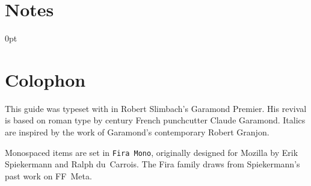 
\chapter{Notes}


\newlength{\enotewidth}
\settowidth{\enotewidth}{00.\enspace}

\renewcommand\enoteheading{}
\renewcommand\makeenmark{\theenmark.\enspace}
\renewcommand\enotesize{\normalsize}
\renewcommand\enoteformat{\leavevmode\llap{\makeenmark}}
\begin{adjustwidth}{\enotewidth}{0pt}
\raggedright
\theendnotes
\end{adjustwidth}

{\let\cleardoublepage\clearpage \chapter{Colophon}}

This guide was typeset with \LuaLaTeX{} in Robert Slimbach's Garamond Premier.
His revival is based on roman type by
 century French
punchcutter Claude Garamond.
Italics are inspired by the work of Garamond's contemporary Robert Granjon.

Monospaced items are set in \texttt{Fira Mono},
originally designed for Mozilla
by Erik Spiekermann and Ralph du~Carrois.
The Fira family draws from Spiekermann's past work on FF~Meta.

